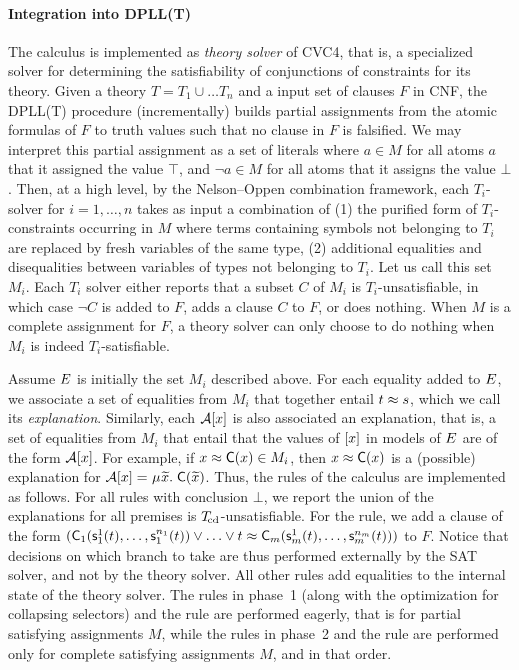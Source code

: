 \paragraph{Integration into DPLL(T)}
The calculus is implemented as \emph{theory solver} of CVC4,
that is, a specialized solver for determining the satisfiability of conjunctions of constraints for its theory.
Given a theory $T = T_1 \mathrel\cup \ldots T_n$ and a input set of clauses $F$ in CNF,
the DPLL(T)  procedure
(incrementally) builds partial assignments from the atomic formulas of $F$ to truth values such that no clause in $F$ is falsified.
We may interpret this partial assignment as a set of literals where $a \in M$ for all atoms $a$ that it assigned the value $\top$, and $\neg a \in M$ for all atoms that it assigns the value $\bot$.
Then, at a high level, by the Nelson--Oppen combination framework,
each $T_i$-solver for $i = 1, \ldots, n$ takes as input a combination of (1) the purified form of $T_i$-constraints occurring in $M$ where terms containing symbols not belonging to $T_i$ are replaced by fresh variables of the same type,
(2) additional equalities and disequalities between variables of types not belonging to $T_i$.
Let us call this set $M_i$.
Each $T_i$ solver either
reports that a subset $C$ of $M_i$ is $T_i$-unsatisfiable, in which case $\neg C$ is added to $F$,
adds a clause $C$ to $F$,
or does nothing.
When $M$ is a complete assignment for $F$, a theory solver can only choose to do nothing when $M_i$ is indeed $T_i$-satisfiable.

Assume $E$ is initially the set $M_i$ described above.
For each equality added to $E$, we associate a set of equalities from $M_i$ that together entail $t \approx s$,
which we call its \emph{explanation}.
Similarly, each $\mathcal{A} [x]$ is also associated an explanation, that is,
a set of equalities from $M_i$ that entail that the values of $[x]$ in models of $E$ are of the form $\mathcal{A} [x]$.
For example, if $x \approx \textsf{C}( x ) \in M_i$, then $x \approx \textsf{C}( x )$ is a (possible) explanation for $\Val \ec{x} = \MU {\Varec{x}}.\; \const{C}( {\Varec{x}} )$.
Thus, the rules of the calculus are implemented as follows.
For all rules with conclusion $\bot$,
we report the union of the explanations for all premises is $T_{\!\mathrm{cd}}$-unsatisfiable.
For the  rule, we add a clause of the form
$(\textsf{C}_1( \textsf{s}^1_1( t ), \ldots, \textsf{s}^{n_1}_1( t ) ) \vee \ldots \vee t \approx \textsf{C}_m( \textsf{s}^1_m( t ), \ldots, \textsf{s}^{n_m}_m( t ) ))$
to $F$.
Notice that decisions on which branch to take are thus performed externally by the SAT solver, and not by the theory solver.
All other rules add equalities to the internal state of the theory solver.
The rules in phase~1 (along with the optimization for collapsing selectors) and the  rule are performed eagerly,
that is for partial satisfying assignments $M$, while the rules in phase~2 and the  rule are performed only for complete satisfying assignments $M$,
and in that order.

